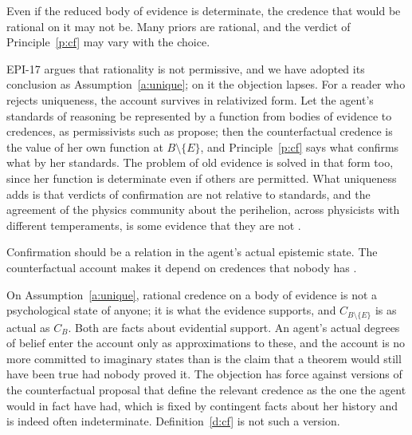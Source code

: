 \documentclass{situationist-preprint}
\begin{document}
\begin{objection}\label{o:perm}
Even if the reduced body of evidence is determinate, the credence that would be rational on it may not be. Many priors are rational, and the verdict of Principle~\ref{p:cf} may vary with the choice.
\end{objection}

\begin{reply}
EPI-17 argues that rationality is not permissive, and we have adopted its conclusion as Assumption~\ref{a:unique}; on it the objection lapses. For a reader who rejects uniqueness, the account survives in relativized form. Let the agent's standards of reasoning be represented by a function from bodies of evidence to credences, as permissivists such as \citet{Schoenfield2014} propose; then the counterfactual credence is the value of her own function at $B \setminus \{E\}$, and Principle~\ref{p:cf} says what confirms what by her standards. The problem of old evidence is solved in that form too, since her function is determinate even if others are permitted. What uniqueness adds is that verdicts of confirmation are not relative to standards, and the agreement of the physics community about the perihelion, across physicists with different temperaments, is some evidence that they are not \citep{White2005}.
\end{reply}

\begin{objection}
Confirmation should be a relation in the agent's actual epistemic state. The counterfactual account makes it depend on credences that nobody has \citep[ch.~5]{Earman1992}.
\end{objection}

\begin{reply}
On Assumption~\ref{a:unique}, rational credence on a body of evidence is not a psychological state of anyone; it is what the evidence supports, and $C_{B \setminus \{E\}}$ is as actual as $C_B$. Both are facts about evidential support. An agent's actual degrees of belief enter the account only as approximations to these, and the account is no more committed to imaginary states than is the claim that a theorem would still have been true had nobody proved it. The objection has force against versions of the counterfactual proposal that define the relevant credence as the one the agent would in fact have had, which is fixed by contingent facts about her history and is indeed often indeterminate. Definition~\ref{d:cf} is not such a version.
\end{reply}
\end{document}
